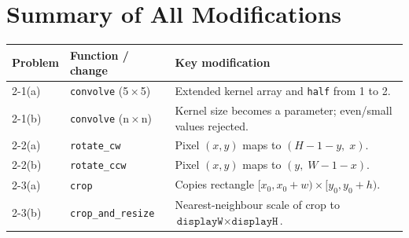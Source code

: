 \documentclass[12pt,a4paper]{article}
\begin{document}
\section*{Summary of All Modifications}

\begin{center}
\begin{tabular}{@{}llp{7cm}@{}}
    \toprule
    \textbf{Problem} & \textbf{Function / change} & \textbf{Key modification} \\
    \midrule
    2-1(a) & \texttt{convolve} (5\,×\,5)
            & Extended kernel array and \texttt{half} from 1 to 2. \\
    2-1(b) & \texttt{convolve} (n\,×\,n)
            & Kernel size becomes a parameter; even/small values rejected. \\
    2-2(a) & \texttt{rotate\_cw}
            & Pixel \((x,y)\) maps to \((H-1-y,\;x)\). \\
    2-2(b) & \texttt{rotate\_ccw}
            & Pixel \((x,y)\) maps to \((y,\;W-1-x)\). \\
    2-3(a) & \texttt{crop}
            & Copies rectangle \([x_0, x_0+w) \times [y_0, y_0+h)\). \\
    2-3(b) & \texttt{crop\_and\_resize}
            & Nearest-neighbour scale of crop to \(\texttt{displayW}\times\texttt{displayH}\). \\
    \bottomrule
\end{tabular}
\end{center}
\end{document}
